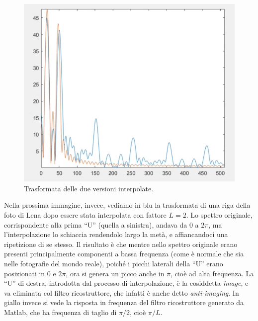 \documentclass[a4paper,11pt]{article}
\begin{document}
\renewcommand{\thefigure}{7.1}
\begin{figure}[!h]
  \centering
    \includegraphics[scale=0.6]{images/7/sinc_vs_rect_interp.png}
    \caption{Trasformata delle due versioni interpolate.}
\end{figure}

\par
Nella prossima immagine, invece, vediamo in blu la trasformata di una riga della foto di Lena dopo essere stata interpolata con fattore $L=2$. Lo spettro originale, corrispondente alla
prima ``U'' (quella a sinistra), andava da 0 a $2\pi$, ma l'interpolazione lo schiaccia rendendolo largo la metà, e affiancandoci una ripetizione di se stesso. Il risultato
è che mentre nello spettro originale erano presenti principalmente componenti a bassa frequenza (come è normale che sia nelle fotografie del mondo reale),
poiché i picchi laterali della ``U'' erano posizionati in 0 e $2\pi$, ora si genera un picco anche in $\pi$, cioè ad alta frequenza.
La ``U'' di destra, introdotta dal processo di interpolazione, è la cosiddetta \textit{image},
e va eliminata col filtro ricostruttore, che infatti è anche detto \textit{anti-imaging}. In giallo invece si vede la risposta in frequenza del filtro
ricostruttore generato da Matlab, che ha frequenza di taglio di $\pi / 2$, cioè $\pi / L$.
\end{document}

